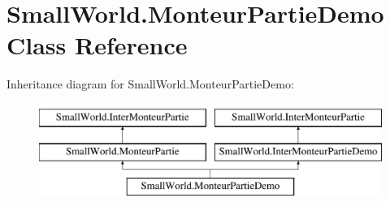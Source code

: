 \hypertarget{class_small_world_1_1_monteur_partie_demo}{\section{Small\-World.\-Monteur\-Partie\-Demo Class Reference}
\label{class_small_world_1_1_monteur_partie_demo}
}
Inheritance diagram for Small\-World.\-Monteur\-Partie\-Demo\-:\begin{figure}[H]
\begin{center}
\leavevmode
\includegraphics[height=3.000000cm]{class_small_world_1_1_monteur_partie_demo}
\end{center}
\end{figure}
